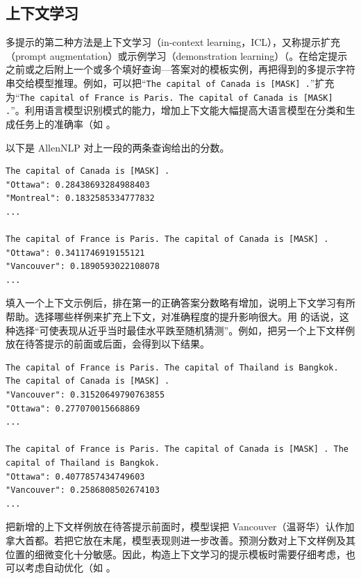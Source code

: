 \subsection{上下文学习}
\label{sec:ch03-icl}
多提示的第二种方法是上下文学习（in-context learning，ICL），又称提示扩充（prompt augmentation）或示例学习（demonstration learning）（。在给定提示之前或之后附上一个或多个填好查询—答案对的模板实例，再把得到的多提示字符串交给模型推理。例如，可以把“\texttt{The capital of Canada is [MASK] .}”扩充为“\texttt{The capital of France is Paris. The capital of Canada is [MASK] .}”。利用语言模型识别模式的能力，增加上下文能大幅提高大语言模型在分类和生成任务上的准确率（如 。

以下是 AllenNLP 对上一段的两条查询给出的分数。

\noindent\begin{minipage}{\linewidth}
\begin{lstlisting}[caption={以加拿大和法国首都为例的上下文学习},label={lst:ch03-icl}]
The capital of Canada is [MASK] .
"Ottawa": 0.28438693284988403
"Montreal": 0.1832585334777832
...

The capital of France is Paris. The capital of Canada is [MASK] .
"Ottawa": 0.3411746919155121
"Vancouver": 0.1890593022108078
...
\end{lstlisting}
\end{minipage}\par

填入一个上下文示例后，排在第一的正确答案分数略有增加，说明上下文学习有所帮助。选择哪些样例来扩充上下文，对准确程度的提升影响很大。用 的话说，这种选择“可使表现从近乎当时最佳水平跌至随机猜测”。例如，把另一个上下文样例放在待答提示的前面或后面，会得到以下结果。
\begin{lstlisting}[caption={扩展上下文示例，包含法国、泰国和加拿大首都},label={lst:ch03-icl-extended}]
The capital of France is Paris. The capital of Thailand is Bangkok. The capital of Canada is [MASK] .
"Vancouver": 0.31520649790763855
"Ottawa": 0.277070015668869
...

The capital of France is Paris. The capital of Canada is [MASK] . The capital of Thailand is Bangkok.
"Ottawa": 0.4077857434749603
"Vancouver": 0.2586808502674103
...
\end{lstlisting}

把新增的上下文样例放在待答提示前面时，模型误把 Vancouver（温哥华）认作加拿大首都。若把它放在末尾，模型表现则进一步改善。预测分数对上下文样例及其位置的细微变化十分敏感。因此，构造上下文学习的提示模板时需要仔细考虑，也可以考虑自动优化（如 。

